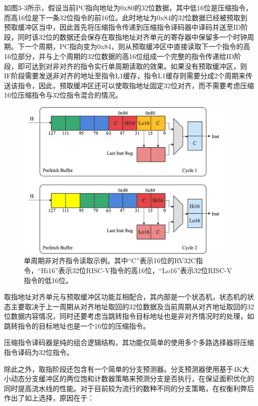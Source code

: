 如图3-3所示，假设当前PC指向地址为0x80的32位数据，其中低16位是压缩指令，而高16位是下一条32位指令的前16位。此时地址为0x84的32位数据已经被预取到预取缓冲区当中，因此首先将压缩指令传递到压缩指令译码器中译码并送至ID阶段，同时该32位的数据还会保存在取指地址对齐单元的寄存器中保留多一个时钟周期。下一个周期，PC指向变为0x84，则从预取缓冲区中直接读取下一个指令的高16位部分，并与上个周期的32位数据的高16位组成一个完整的指令传递给ID阶段，即可达到对非对齐的指令实行单周期读取的效果。如果没有预取缓冲区，则IF阶段需要发送非对齐的地址至指令L1缓存，指令L1缓存则需要分成2个周期来传送该指令，因此，预取缓冲区还可以使取指地址固定32位对齐，而不需要考虑压缩16位压缩指令与32位指令混合的情况。

\begin{figure}[htbp]
	\centering
	\includegraphics[width=0.95\textwidth]{Photos/PrefetchBuffer.png}
	\caption{单周期非对齐指令读取示例。其中“C”表示16位的RV32C指令，“Hi16”表示32位RISC-V指令的高16位，“Lo16”表示32位RISC-V指令的低16位。}
\end{figure}

取指地址对齐单元与预取缓冲区功能互相配合，其内部是一个状态机，状态机的状态主要取决于上一周期从对齐地址取回的32位数据及当前周期从对齐地址取回的32位数据内容情况，同时还要考虑当跳转指令目标地址也是非对齐情况时的处理，如跳转指令的目标地址也是一个16位的压缩指令。

压缩指令译码器是纯的组合逻辑结构，其功能仅简单的使用多个多路选择器将压缩指令译码为32位指令。

除此之外，取指阶段还包含有一个简单的分支预测器。分支预测器使用基于4K大小动态分支缓冲区的两位饱和计数器策略来预测分支是否执行，在保证面积优化的同时提高流水线的性能。对于目前较为流行的数种不同的分支策略，在权衡利弊后作出了如上选择，原因在于：

